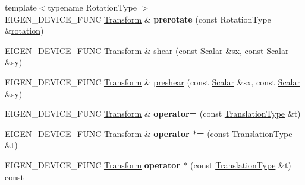\begin{DoxyCompactItemize}
\item 
\mbox{\label{class_eigen_1_1_transform_a2b8550faa1c809234a156aa6947f4988}} 
{\footnotesize template$<$typename Rotation\+Type $>$ }\\E\+I\+G\+E\+N\+\_\+\+D\+E\+V\+I\+C\+E\+\_\+\+F\+U\+NC \mbox{\hyperlink{class_eigen_1_1_transform}{Transform}} \& {\bfseries prerotate} (const Rotation\+Type \&\mbox{\hyperlink{class_eigen_1_1_transform_a87eb429e076e2c15a1bfbe99b43ae07c}{rotation}})
\item 
E\+I\+G\+E\+N\+\_\+\+D\+E\+V\+I\+C\+E\+\_\+\+F\+U\+NC \mbox{\hyperlink{class_eigen_1_1_transform}{Transform}} \& \mbox{\hyperlink{class_eigen_1_1_transform_a2999a84269a4a08d3af8a3ad1b0598ef}{shear}} (const \mbox{\hyperlink{class_eigen_1_1_transform_a4e69ced9d651745b8ed4eda46f41795d}{Scalar}} \&sx, const \mbox{\hyperlink{class_eigen_1_1_transform_a4e69ced9d651745b8ed4eda46f41795d}{Scalar}} \&sy)
\item 
E\+I\+G\+E\+N\+\_\+\+D\+E\+V\+I\+C\+E\+\_\+\+F\+U\+NC \mbox{\hyperlink{class_eigen_1_1_transform}{Transform}} \& \mbox{\hyperlink{class_eigen_1_1_transform_a2540957bb590f16260689bcf32d28a7a}{preshear}} (const \mbox{\hyperlink{class_eigen_1_1_transform_a4e69ced9d651745b8ed4eda46f41795d}{Scalar}} \&sx, const \mbox{\hyperlink{class_eigen_1_1_transform_a4e69ced9d651745b8ed4eda46f41795d}{Scalar}} \&sy)
\item 
\mbox{\label{class_eigen_1_1_transform_af7d406aca4233e1bb6d4a35f48130b46}} 
E\+I\+G\+E\+N\+\_\+\+D\+E\+V\+I\+C\+E\+\_\+\+F\+U\+NC \mbox{\hyperlink{class_eigen_1_1_transform}{Transform}} \& {\bfseries operator=} (const \mbox{\hyperlink{class_eigen_1_1_transform_a6b463d14d8be4c0eda2eed6e943b831f}{Translation\+Type}} \&t)
\item 
\mbox{\label{class_eigen_1_1_transform_ae3f74ca24548e634b9ab9652044d482f}} 
E\+I\+G\+E\+N\+\_\+\+D\+E\+V\+I\+C\+E\+\_\+\+F\+U\+NC \mbox{\hyperlink{class_eigen_1_1_transform}{Transform}} \& {\bfseries operator $\ast$=} (const \mbox{\hyperlink{class_eigen_1_1_transform_a6b463d14d8be4c0eda2eed6e943b831f}{Translation\+Type}} \&t)
\item 
\mbox{\label{class_eigen_1_1_transform_ad599b40e8ef1768f3bc3e1ae9e4ee42e}} 
E\+I\+G\+E\+N\+\_\+\+D\+E\+V\+I\+C\+E\+\_\+\+F\+U\+NC \mbox{\hyperlink{class_eigen_1_1_transform}{Transform}} {\bfseries operator $\ast$} (const \mbox{\hyperlink{class_eigen_1_1_transform_a6b463d14d8be4c0eda2eed6e943b831f}{Translation\+Type}} \&t) const

\end{DoxyCompactItemize}
